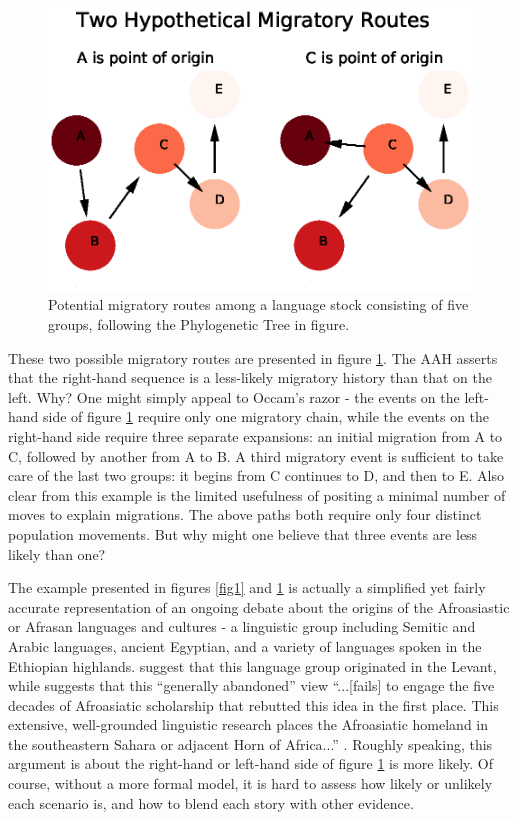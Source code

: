 \documentclass[11pt]{article}
\begin{document}
\begin{figure}
\begin{center} 
\includegraphics[width=\textwidth]{AncillaryFiles//figure2.eps} 
\caption{Potential migratory routes among a language stock consisting of five groups, following the Phylogenetic Tree in figure.} \label{fig2}
\end{center} 
\end{figure}

These two possible migratory routes are presented in figure \ref{fig2}. The AAH asserts that the right-hand sequence is a less-likely migratory history than that on the left. Why? One might simply appeal to Occam's razor - the events on the left-hand side of figure \ref{fig2} require only one migratory chain, while the events on the right-hand side require three separate expansions: an initial migration from A to C, followed by another from A to B. A third migratory event is sufficient to take care of the last two groups: it begins from C continues to D, and then to E. Also clear from this example is the limited usefulness of positing a minimal number of moves to explain migrations. The above paths both require only four distinct population movements. But why might one believe that three events are less likely than one? 

The example presented in figures \ref{fig1} and \ref{fig2} is actually a simplified yet fairly accurate representation of an ongoing debate about the origins of the Afroasiastic or Afrasan languages and cultures - a linguistic group including Semitic and Arabic languages, ancient Egyptian, and a variety of languages spoken in the Ethiopian highlands. \cite{diamond03} suggest that this language group originated in the Levant, while \cite{ehret04} suggests that this ``generally abandoned'' view ``...[fails] to engage the five decades of Afroasiatic scholarship that rebutted this idea in the first place. This extensive, well-grounded linguistic research places the Afroasiatic homeland in the southeastern Sahara or adjacent Horn of Africa...'' \citep[p. 1680]{ehret04}. Roughly speaking, this argument is about the right-hand or left-hand side of figure \ref{fig2} is more likely. Of course, without a more formal model, it is hard to assess how likely or unlikely each scenario is, and how to blend each story with other evidence. 
\end{document}
